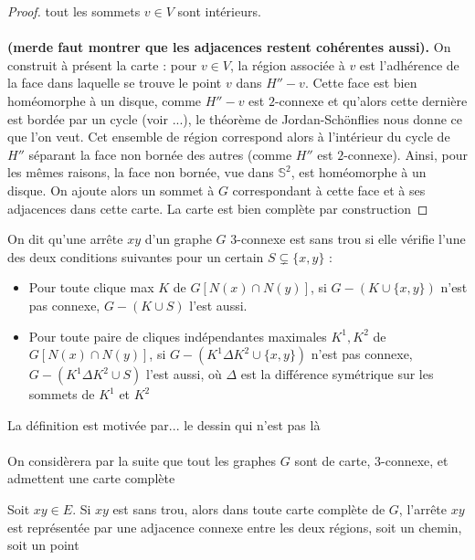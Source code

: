 \documentclass{scrartcl}
\begin{document}
\begin{flushleft}
\begin{proof}
    tout les sommets $v \in V$ sont intérieurs.
    \\~\\
    \textbf{(merde faut montrer que les adjacences restent cohérentes aussi).}
    On construit à présent la carte : pour $v \in V$, la région associée à $v$ est l'adhérence de la face dans laquelle se trouve
    le point $v$ dans $H'' - v$. Cette face est bien homéomorphe à un disque, comme $H'' - v$ est $2$-connexe et qu'alors
    cette dernière est bordée par un cycle (voir ...), le théorème de Jordan-Schönflies nous donne ce que l'on veut.
    Cet ensemble de région correspond alors à l'intérieur du cycle de $H''$
    séparant la face non bornée des autres (comme $H''$ est $2$-connexe). Ainsi, pour les mêmes raisons, la face non bornée, vue dans $\mathbb{S}^2$,
    est homéomorphe à un disque. On ajoute alors un sommet à $G$ correspondant à cette face et à ses adjacences dans cette carte.
    La carte est bien complète par construction

\end{proof}

\begin{def*}
    On dit qu'une arrête $xy$ d'un graphe $G$ $3$-connexe est sans trou si elle vérifie l'une des deux conditions suivantes pour un certain
    $S \subsetneq \{x, y\}$ :
    \begin{itemize}
        \item Pour toute clique max $K$ de $G[N(x) \cap N(y)]$, si $G - (K \cup \{x,y\})$ n'est pas connexe, $G - (K \cup S)$ l'est aussi.
        \item Pour toute paire de cliques indépendantes maximales $K^1, K^2$ de $G[N(x) \cap N(y)]$, si $G - (K^1 \Delta K^2 \cup \{x,y\})$ n'est pas connexe,
        $G - (K^1 \Delta K^2 \cup S)$ l'est aussi, où $\Delta$ est la différence symétrique sur les sommets de $K^1$ et $K^2$
    \end{itemize}
\end{def*}

La définition est motivée par... le dessin qui n'est pas là
\\~\\
On considèrera par la suite que tout les graphes $G$ sont de carte, $3$-connexe, et admettent une carte complète

\begin{lem}\label{contrSanstrou}
    Soit $xy \in E$. Si $xy$ est sans trou, alors dans toute carte complète de $G$, l'arrête $xy$ est représentée par une adjacence
    connexe entre les deux régions, soit un chemin, soit un point
\end{lem}


\end{flushleft}
\end{document}

